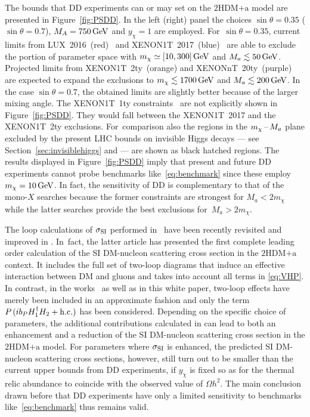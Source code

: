 \documentclass[a4paper, 11pt,notoc]{article}
\newcommand{\hdma}{\ensuremath{\textrm{2HDM+a}}\xspace}
\begin{document}
The bounds that DD experiments can or may set on the  \hdma model are presented in Figure~\ref{fig:PSDD}. In the left (right) panel the choices $\sin \theta = 0.35$ ($\sin \theta = 0.7$), $M_A = 750 \, {\rm GeV}$ and $y_\chi = 1$ are employed. For~$\sin \theta = 0.35$,  current limits from LUX~2016~(red)~\cite{Akerib:2016vxi} and  XENON1T~2017~(blue)~\cite{Aprile:2017iyp} are able to exclude the portion of parameter space with $m_\chi \simeq [10, 300 ]\, {\rm GeV}$ and $M_a \lesssim 50 \, {\rm GeV}$. Projected limits from XENON1T~2ty~(orange) and XENONnT~20ty~(purple)~\cite{Aprile:2015uzo} are expected to expand the exclusions to $m_\chi \lesssim 1700 \, {\rm GeV}$ and $M_a \lesssim 200 \, {\rm GeV}$. In the case $\sin \theta = 0.7$, the obtained limits are slightly better because of the larger mixing angle.  The XENON1T~1ty constraints~\cite{Aprile:2018dbl} are not explicitly shown  in Figure~\ref{fig:PSDD}. They would fall between the  XENON1T~2017 and the XENON1T~2ty exclusions. For~comparison also the regions in the $m_\chi \hspace{0.5mm}$--$\hspace{0.5mm} M_a$ plane excluded by the present  LHC bounds on invisible Higgs decays --- see Section~\ref{sec:invisiblehiggs} and \cite{Bauer:2017ota} --- are shown as black hatched regions.  The results displayed in Figure~\ref{fig:PSDD} imply that present and future DD experiments cannot probe benchmarks like~\eqref{eq:benchmark} since these employ $m_\chi = 10 \, {\rm GeV}$. In fact, the sensitivity of DD is complementary to that of the mono-$X$ searches because the former constraints are strongest for $M_a < 2 m_\chi$ while the latter searches provide the best exclusions for~$M_a > 2 m_\chi$. 

The loop calculations of  $\sigma_{\rm SI}$ performed in~\cite{Ipek:2014gua,Arcadi:2017wqi,Sanderson:2018lmj,Li:2018qip} have been recently revisited and improved in \cite{Abe:2018emu}.  In~fact, the latter article has presented the first complete leading order calculation of the SI DM-nucleon scattering cross section in the  \hdma context. It includes the full set of two-loop diagrams that induce an effective interaction between DM and gluons and takes into account all terms in \eqref{eq:VHP}. In contrast, in the works~\cite{Ipek:2014gua,Arcadi:2017wqi,Sanderson:2018lmj,Li:2018qip}  as well as in this white paper, two-loop effects have merely been included in an approximate fashion and only the term $P  \hspace{0.5mm} ( i  b_P   H_1^\dagger H_2 + {\rm h.c.} )$ has been considered. Depending on the specific choice of parameters, the additional contributions calculated in \cite{Abe:2018emu} can lead to both an enhancement and a reduction of the SI DM-nucleon scattering cross section in the \hdma model. For parameters where $\sigma_{\rm SI}$ is enhanced, the predicted SI DM-nucleon scattering cross sections, however, still turn out to be smaller than the current upper bounds from DD experiments, if $y_\chi$ is fixed so as for the  thermal relic abundance to coincide with the observed value of $\Omega h^{2}$. The main conclusion drawn before that DD experiments have only a limited sensitivity to benchmarks like~\eqref{eq:benchmark} thus remains valid.  
\end{document}
